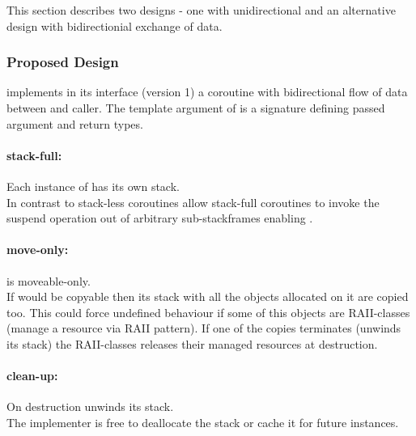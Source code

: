 This section describes two designs - one with unidirectional and an alternative
design with bidirectionial exchange of data.\\

\subsubsection*{Proposed Design}
\boostcoroutine implements in its interface (version 1) a coroutine with
bidirectional flow of data between \corofunction and caller. The template
argument of \coro is a signature defining passed argument and return types.

\paragraph*{stack-full:}
Each instance of \coro has its own stack.\\
\newline
In contrast to stack-less coroutines allow stack-full coroutines to invoke the
suspend operation out of arbitrary sub-stackframes enabling \escreops.

\paragraph*{move-only:}
\coro is moveable-only.\\
\newline
If \coro would be copyable then its stack with all the objects allocated on it
are copied too. This could force undefined behaviour if some of this objects are
RAII-classes (manage a resource via RAII pattern). If one of the \coro copies
terminates (unwinds its stack) the RAII-classes releases their managed resources
at destruction.

\paragraph*{clean-up:}
On destruction \coro unwinds its stack.\\
\newline
The implementer is free to deallocate the stack or cache it for future \coro
instances.


